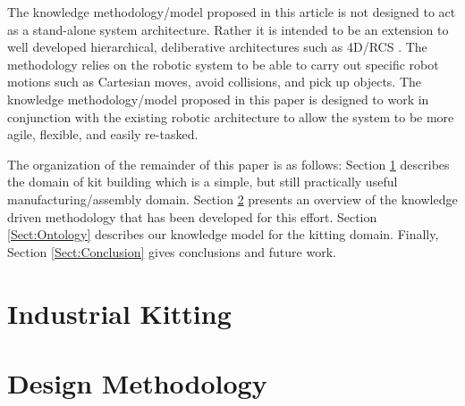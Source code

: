 \documentclass[preprint,12pt]{elsarticle}
\begin{document}
The knowledge methodology/model proposed in this article is not designed to act as a stand-alone
system architecture. Rather it is intended to be an extension to well developed hierarchical, 
deliberative architectures such as 4D/RCS \cite{Albus2000}. The methodology relies on the robotic system
to be able to carry out
specific robot motions such as Cartesian moves, avoid collisions, and pick up objects. 
The knowledge methodology/model proposed in this paper is designed to work in conjunction with the existing
robotic architecture to allow the system to be more agile, flexible, and easily re-tasked.


The organization of the remainder of this paper is as follows: Section \ref{Sect:Kitting} describes the domain of kit building
which is a simple, but still practically useful manufacturing/assembly domain.
Section \ref{Sect:Methodology} presents an overview of the knowledge driven methodology that
has been developed for this effort.  Section \ref{Sect:Ontology} describes our knowledge model for the kitting
domain. Finally, Section \ref{Sect:Conclusion} gives conclusions and
future work.

\section{Industrial Kitting}
\label{Sect:Kitting}


\section{Design Methodology}
\label{Sect:Methodology}


\end{document}
